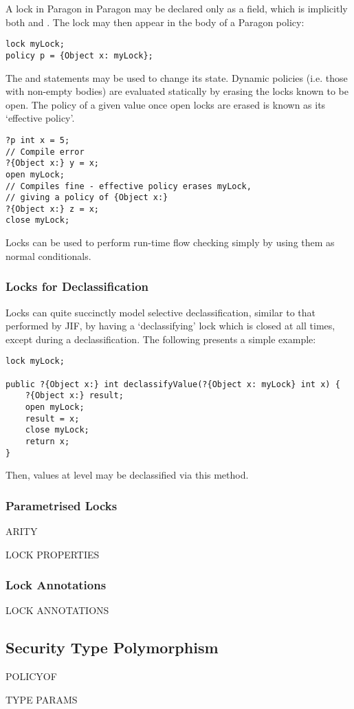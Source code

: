 A lock in Paragon in Paragon may be declared only as a field, which is implicitly both  and . The lock may then appear in the body of a Paragon policy:

\begin{verbatim}
lock myLock;
policy p = {Object x: myLock};
\end{verbatim}

The  and  statements may be used to change its state. Dynamic policies (i.e. those with non-empty bodies) are evaluated statically by erasing the locks known to be open. The policy of a given value once open locks are erased is known as its `effective policy'.

\begin{verbatim}
?p int x = 5;
// Compile error
?{Object x:} y = x;
open myLock;
// Compiles fine - effective policy erases myLock,
// giving a policy of {Object x:}
?{Object x:} z = x;
close myLock;
\end{verbatim}

Locks can be used to perform run-time flow checking simply by using them as normal conditionals.

\subsubsection{Locks for Declassification}

Locks can quite succinctly model selective declassification, similar to that performed by JIF, by having a `declassifying' lock which is closed at all times, except during a declassification. The following presents a simple example:

\begin{verbatim}
lock myLock;

public ?{Object x:} int declassifyValue(?{Object x: myLock} int x) {
	?{Object x:} result;
	open myLock;
	result = x;
	close myLock;
	return x;
}
\end{verbatim}

Then, values at level  may be declassified via this method.

\subsubsection{Parametrised Locks}

ARITY

LOCK PROPERTIES

\subsubsection{Lock Annotations}

LOCK ANNOTATIONS

\subsection{Security Type Polymorphism} \label{para_generics}

POLICYOF

TYPE PARAMS

